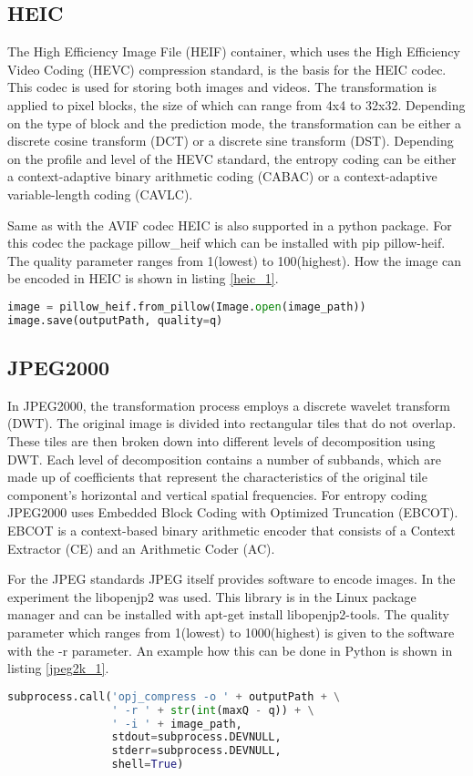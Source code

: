 \subsection{HEIC}
The High Efficiency Image File (HEIF) container, which uses the High Efficiency Video Coding (HEVC) compression standard, is the basis for the HEIC codec. This codec is used for storing both images and videos. 
The transformation is applied to pixel blocks, the size of which can range from 4x4 to 32x32. Depending on the type of block and the prediction mode, the transformation can be either a discrete cosine transform (DCT) or a discrete sine transform (DST).
Depending on the profile and level of the HEVC standard, the entropy coding can be either a context-adaptive binary arithmetic coding (CABAC) or a context-adaptive variable-length coding (CAVLC).

Same as with the AVIF codec HEIC is also supported in a python package. For this codec the package pillow\_heif which can be installed with pip pillow-heif. The quality parameter ranges from 1(lowest) to 100(highest).
How the image can be encoded in HEIC is shown in listing \ref{heic_1}.

\begin{lstlisting}[label={heic_1}, language=Python, caption=Encode HEIC]
image = pillow_heif.from_pillow(Image.open(image_path))
image.save(outputPath, quality=q)
\end{lstlisting}

\subsection{JPEG2000}
In JPEG2000, the transformation process employs a discrete wavelet transform (DWT). The original image is divided into rectangular tiles that do not overlap. These tiles are then broken down into different levels of decomposition using DWT. Each level of decomposition contains a number of subbands, which are made up of coefficients that represent the characteristics of the original tile component’s horizontal and vertical spatial frequencies.
For entropy coding JPEG2000 uses Embedded Block Coding with Optimized Truncation (EBCOT). EBCOT is a context-based binary arithmetic encoder that consists of a Context Extractor (CE) and an Arithmetic Coder (AC).

For the JPEG standards JPEG itself provides software to encode images. In the experiment the libopenjp2 was used. This library is in the Linux package manager and can be installed with apt-get install libopenjp2-tools. The quality parameter which ranges from 1(lowest) to 1000(highest) is given to the software with the -r parameter. An example how this can be done in Python is shown in listing \ref{jpeg2k_1}.
\begin{lstlisting}[label={jpeg2k_1}, language=Python, caption=Encode JPEG 2000]
subprocess.call('opj_compress -o ' + outputPath + \
                ' -r ' + str(int(maxQ - q)) + \
                ' -i ' + image_path,
                stdout=subprocess.DEVNULL,
                stderr=subprocess.DEVNULL,
                shell=True)
\end{lstlisting}


